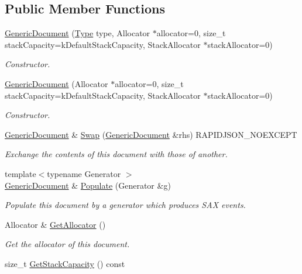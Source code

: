 \subsection*{Public Member Functions}
\begin{DoxyCompactItemize}
\item 
\hyperlink{a00115_a3da21e72ec8f26b9da77d86cc1d41cdd}{Generic\+Document} (\hyperlink{a00677_a1d1cfd8ffb84e947f82999c682b666a7}{Type} type, Allocator $\ast$allocator=0, size\+\_\+t stack\+Capacity=k\+Default\+Stack\+Capacity, Stack\+Allocator $\ast$stack\+Allocator=0)
\begin{DoxyCompactList}\small\item\em Constructor. \end{DoxyCompactList}\item 
\hyperlink{a00115_a6b1c313ad538cafc4d23d4bd5f97178c}{Generic\+Document} (Allocator $\ast$allocator=0, size\+\_\+t stack\+Capacity=k\+Default\+Stack\+Capacity, Stack\+Allocator $\ast$stack\+Allocator=0)
\begin{DoxyCompactList}\small\item\em Constructor. \end{DoxyCompactList}\item 
\hyperlink{a00115}{Generic\+Document} \& \hyperlink{a00115_a6290e1290fad74177625af5938c0c58f}{Swap} (\hyperlink{a00115}{Generic\+Document} \&rhs) R\+A\+P\+I\+D\+J\+S\+O\+N\+\_\+\+N\+O\+E\+X\+C\+E\+PT
\begin{DoxyCompactList}\small\item\em Exchange the contents of this document with those of another. \end{DoxyCompactList}\item 
{\footnotesize template$<$typename Generator $>$ }\\\hyperlink{a00115}{Generic\+Document} \& \hyperlink{a00115_a36fbc7d0a9595d26e0d2c8859d207d1f}{Populate} (Generator \&g)
\begin{DoxyCompactList}\small\item\em Populate this document by a generator which produces S\+AX events. \end{DoxyCompactList}\item 
Allocator \& \hyperlink{a00115_aa4609d6b19f86aec1a6b96edf2c27686}{Get\+Allocator} ()\hypertarget{a00115_aa4609d6b19f86aec1a6b96edf2c27686}{}\label{a00115_aa4609d6b19f86aec1a6b96edf2c27686}

\begin{DoxyCompactList}\small\item\em Get the allocator of this document. \end{DoxyCompactList}\item 
size\+\_\+t \hyperlink{a00115_aa99f03016f4907332fcf70aadb645194}{Get\+Stack\+Capacity} () const \hypertarget{a00115_aa99f03016f4907332fcf70aadb645194}{}\label{a00115_aa99f03016f4907332fcf70aadb645194}


\end{DoxyCompactItemize}
